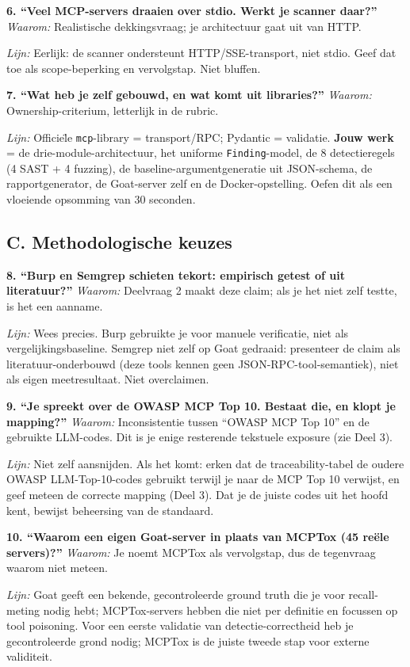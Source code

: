 \documentclass[11pt,a4paper]{article}
\newcommand{\code}[1]{\texttt{\small #1}}
\newcommand{\waarom}[1]{{\color{hggrey}\textit{Waarom:} #1}\par}
\newcommand{\lijn}[1]{\textit{Lijn:} #1\par}
\begin{document}
\textbf{6. ``Veel MCP-servers draaien over stdio. Werkt je scanner daar?''}
\waarom{Realistische dekkingsvraag; je architectuur gaat uit van HTTP.}
\lijn{Eerlijk: de scanner ondersteunt HTTP/SSE-transport, niet stdio. Geef dat toe als scope-beperking en vervolgstap. Niet bluffen.}

\textbf{7. ``Wat heb je zelf gebouwd, en wat komt uit libraries?''}
\waarom{Ownership-criterium, letterlijk in de rubric.}
\lijn{Officie\"le \code{mcp}-library = transport/RPC; Pydantic = validatie. \textbf{Jouw werk} = de drie-module-architectuur, het uniforme \code{Finding}-model, de 8 detectieregels (4 SAST + 4 fuzzing), de baseline-argumentgeneratie uit JSON-schema, de rapportgenerator, de Goat-server zelf en de Docker-opstelling. Oefen dit als een vloeiende opsomming van 30 seconden.}

\subsection{C. Methodologische keuzes}

\textbf{8. ``Burp en Semgrep schieten tekort: empirisch getest of uit literatuur?''}
\waarom{Deelvraag 2 maakt deze claim; als je het niet zelf testte, is het een aanname.}
\lijn{Wees precies. Burp gebruikte je voor manuele verificatie, niet als vergelijkingsbaseline. Semgrep niet zelf op Goat gedraaid: presenteer de claim als literatuur-onderbouwd (deze tools kennen geen JSON-RPC-tool-semantiek), niet als eigen meetresultaat. Niet overclaimen.}

\textbf{9. ``Je spreekt over de OWASP MCP Top 10. Bestaat die, en klopt je mapping?''}
\waarom{Inconsistentie tussen ``OWASP MCP Top 10'' en de gebruikte LLM-codes. Dit is je enige resterende tekstuele exposure (zie Deel 3).}
\lijn{Niet zelf aansnijden. Als het komt: erken dat de traceability-tabel de oudere OWASP LLM-Top-10-codes gebruikt terwijl je naar de MCP Top 10 verwijst, en geef meteen de correcte mapping (Deel 3). Dat je de juiste codes uit het hoofd kent, bewijst beheersing van de standaard.}

\textbf{10. ``Waarom een eigen Goat-server in plaats van MCPTox (45 re\"ele servers)?''}
\waarom{Je noemt MCPTox als vervolgstap, dus de tegenvraag waarom niet meteen.}
\lijn{Goat geeft een bekende, gecontroleerde ground truth die je voor recall-meting nodig hebt; MCPTox-servers hebben die niet per definitie en focussen op tool poisoning. Voor een eerste validatie van detectie-correctheid heb je gecontroleerde grond nodig; MCPTox is de juiste tweede stap voor externe validiteit.}
\end{document}
